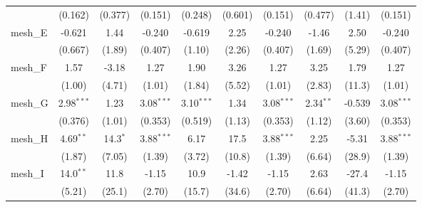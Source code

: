 \begin{tabular}{lccccccccc}
                                                               & (0.162)        & (0.377)        & (0.151)       & (0.248)        & (0.601)        & (0.151)       & (0.477)       & (1.41)        & (0.151)\\   
   mesh\_E                                                     & -0.621         & 1.44           & -0.240        & -0.619         & 2.25           & -0.240        & -1.46         & 2.50          & -0.240\\   
                                                               & (0.667)        & (1.89)         & (0.407)       & (1.10)         & (2.26)         & (0.407)       & (1.69)        & (5.29)        & (0.407)\\   
   mesh\_F                                                     & 1.57           & -3.18          & 1.27          & 1.90           & 3.26           & 1.27          & 3.25          & 1.79          & 1.27\\   
                                                               & (1.00)         & (4.71)         & (1.01)        & (1.84)         & (5.52)         & (1.01)        & (2.83)        & (11.3)        & (1.01)\\   
   mesh\_G                                                     & 2.98$^{***}$   & 1.23           & 3.08$^{***}$  & 3.10$^{***}$   & 1.34           & 3.08$^{***}$  & 2.34$^{**}$   & -0.539        & 3.08$^{***}$\\   
                                                               & (0.376)        & (1.01)         & (0.353)       & (0.519)        & (1.13)         & (0.353)       & (1.12)        & (3.60)        & (0.353)\\   
   mesh\_H                                                     & 4.69$^{**}$    & 14.3$^{*}$     & 3.88$^{***}$  & 6.17           & 17.5           & 3.88$^{***}$  & 2.25          & -5.31         & 3.88$^{***}$\\   
                                                               & (1.87)         & (7.05)         & (1.39)        & (3.72)         & (10.8)         & (1.39)        & (6.64)        & (28.9)        & (1.39)\\   
   mesh\_I                                                     & 14.0$^{**}$    & 11.8           & -1.15         & 10.9           & -1.42          & -1.15         & 2.63          & -27.4         & -1.15\\   
                                                               & (5.21)         & (25.1)         & (2.70)        & (15.7)         & (34.6)         & (2.70)        & (6.64)        & (41.3)        & (2.70)\\   

\end{tabular}
